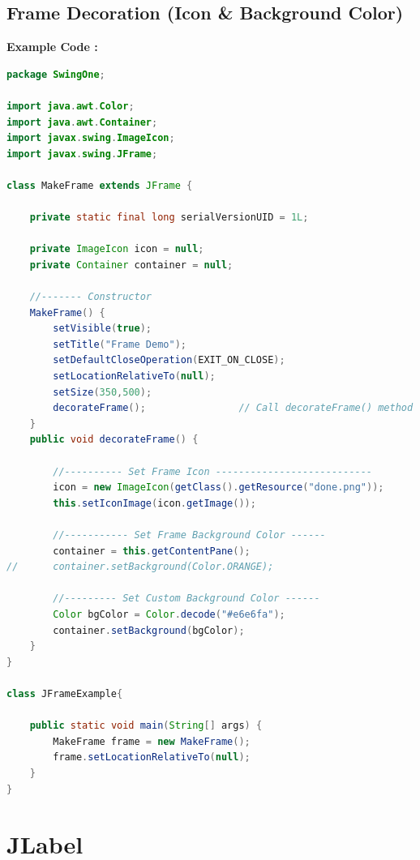 \subsection{Frame Decoration (Icon \& Background Color)}
\textbf{Example Code :}
\begin{lstlisting}[language=java]
package SwingOne;

import java.awt.Color;
import java.awt.Container;
import javax.swing.ImageIcon;
import javax.swing.JFrame;

class MakeFrame extends JFrame {
	
	private static final long serialVersionUID = 1L;
	
	private ImageIcon icon = null;
	private Container container = null;

	//------- Constructor
	MakeFrame() {
		setVisible(true);
		setTitle("Frame Demo");
		setDefaultCloseOperation(EXIT_ON_CLOSE);
		setLocationRelativeTo(null);
		setSize(350,500);
		decorateFrame();				// Call decorateFrame() method
	}
	public void decorateFrame() {
		
		//---------- Set Frame Icon ---------------------------
		icon = new ImageIcon(getClass().getResource("done.png"));
		this.setIconImage(icon.getImage());
		
		//----------- Set Frame Background Color ------
		container = this.getContentPane();
//		container.setBackground(Color.ORANGE);
		
		//--------- Set Custom Background Color ------
		Color bgColor = Color.decode("#e6e6fa");
		container.setBackground(bgColor);
	}
}

class JFrameExample{
	
	public static void main(String[] args) {
		MakeFrame frame = new MakeFrame();
		frame.setLocationRelativeTo(null);
	}
}
\end{lstlisting}



\newpage
\section{JLabel}
